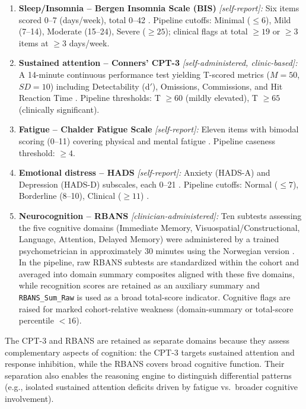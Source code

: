 \documentclass[11pt,a4paper]{article}
\begin{document}
\begin{enumerate}[leftmargin=*, label=\arabic*.]
    \item \textbf{Sleep/Insomnia -- Bergen Insomnia Scale (BIS)} \textit{[self-report]:} Six items scored 0--7 (days/week), total 0--42 \citep{Pallesen2008}. Pipeline cutoffs: Minimal ($\leq 6$), Mild (7--14), Moderate (15--24), Severe ($\geq 25$); clinical flags at total $\geq 19$ or $\geq 3$ items at $\geq 3$ days/week.

    \item \textbf{Sustained attention -- Conners' CPT-3} \textit{[self-administered, clinic-based]:} A 14-minute continuous performance test yielding T-scored metrics ($M = 50$, $SD = 10$) including Detectability (d$'$), Omissions, Commissions, and Hit Reaction Time \citep{Conners2014}. Pipeline thresholds: T $\geq 60$ (mildly elevated), T $\geq 65$ (clinically significant).

    \item \textbf{Fatigue -- Chalder Fatigue Scale} \textit{[self-report]:} Eleven items with bimodal scoring (0--11) covering physical and mental fatigue \citep{Chalder1993}. Pipeline caseness threshold: $\geq 4$.

    \item \textbf{Emotional distress -- HADS} \textit{[self-report]:} Anxiety (HADS-A) and Depression (HADS-D) subscales, each 0--21 \citep{Zigmond1983}. Pipeline cutoffs: Normal ($\leq 7$), Borderline (8--10), Clinical ($\geq 11$) \citep{Bjelland2002}.

    \item \textbf{Neurocognition -- RBANS} \textit{[clinician-administered]:} Ten subtests assessing the five cognitive domains (Immediate Memory, Visuospatial/Constructional, Language, Attention, Delayed Memory) were administered by a trained psychometrician in approximately 30 minutes using the Norwegian version \citep{Randolph2013NO}. In the pipeline, raw RBANS subtests are standardized within the cohort and averaged into domain summary composites aligned with these five domains, while recognition scores are retained as an auxiliary summary and \texttt{RBANS\_Sum\_Raw} is used as a broad total-score indicator. Cognitive flags are raised for marked cohort-relative weakness (domain-summary or total-score percentile $< 16$).
\end{enumerate}

\noindent
The CPT-3 and RBANS are retained as separate domains because they assess complementary aspects of cognition: the CPT-3 targets sustained attention and response inhibition, while the RBANS covers broad cognitive function. Their separation also enables the reasoning engine to distinguish differential patterns (e.g., isolated sustained attention deficits driven by fatigue vs.\ broader cognitive involvement).
\end{document}
